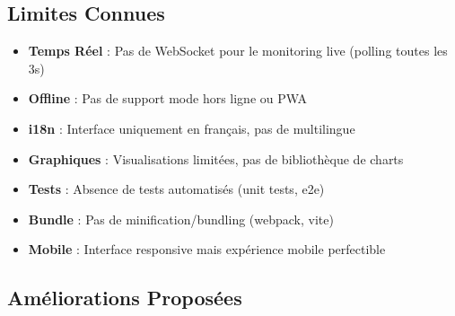 \documentclass[12pt,a4paper]{article}
\begin{document}
\subsection{Limites Connues}

\begin{warningbox}
\begin{itemize}
    \item \textbf{Temps Réel} : Pas de WebSocket pour le monitoring live (polling toutes les 3s)
    \item \textbf{Offline} : Pas de support mode hors ligne ou PWA
    \item \textbf{i18n} : Interface uniquement en français, pas de multilingue
    \item \textbf{Graphiques} : Visualisations limitées, pas de bibliothèque de charts
    \item \textbf{Tests} : Absence de tests automatisés (unit tests, e2e)
    \item \textbf{Bundle} : Pas de minification/bundling (webpack, vite)
    \item \textbf{Mobile} : Interface responsive mais expérience mobile perfectible
\end{itemize}
\end{warningbox}

\subsection{Améliorations Proposées}
\end{document}
